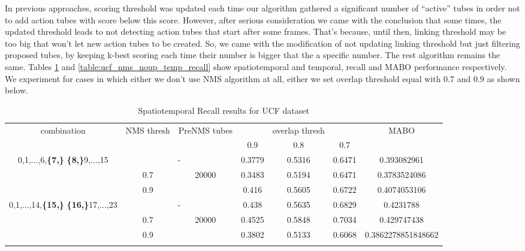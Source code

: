 In previous approaches, scoring threshold was updated each time our algorithm gathered a significant number of ``active'' tubes in order not
to add action tubes with score below this score. However, after serious consideration we came with the conclusion that some times, the updated
threshold leads to not detecting action tubes that start after some frames. That's because, until then, linking threshold may be too big that
won't let new action tubes to be created. So, we came with the modification of not updating linking threshold but just filtering proposed
tubes, by keeping k-best scoring each time their number is bigger that the a specific number. The rest algorithm remains the same. Tables
\ref{table:ucf_nms_noup_recall} and \ref{table:ucf_nms_noup_temp_recall} show spatiotemporal and temporal, recall and MABO performance respectively.
We experiment for cases in which either we don't use NMS algorithm at all, either we set overlap threshold equal with 0.7 and 0.9 as shown
below.

\begin{center}
  \setlength{\tabcolsep}{2pt}
\begin{longtable}{||c | c | c | c c c| c|}

  \hline
  \multirow{2}{*}{combination} & \multirow{2}{2.5em}{NMS thresh} & \multirow{2}{3.5em}{PreNMS tubes} &  {} &overlap thresh & {} & \multirow{2}{*}{MABO} \\
  {} & {} & {} &  0.9 &  0.8 & 0.7 & {}\\         
  \hline
  \multirow{3}{7em}{0,1,...,6,\textbf{\{7,\}}
  \textbf{\{8,\}}9,...,15 }   &   \multicolumn{2}{|c|}{-}     &  0.3779 & 0.5316 & 0.6471 & 0.393082961 \\
  \cline{2-7}
  {} & 0.7 &\multirow{2}{*}{20000}  & 0.3483  & 0.5194 & 0.6471 & 0.3783524086 \\
  \cline{2-2} \cline{4-7} 
  {} &  0.9   & {}   & 0.416 & 0.5605 & 0.6722 & 0.4074053106 \\
  \hline                                    
  \multirow{3}{7em}{0,1,...,14,\textbf{\{15,\}}
  \textbf{\{16,\}}17,...,23 }  &   \multicolumn{2}{|c|}{-} & 0.438 & 0.5635 & 0.6829 & 0.4231788 \\
  \cline{2-7}
  {} & 0.7 & \multirow{2}{*}{20000}   & 0.4525 & 0.5848 & 0.7034 & 0.429747438 \\
  \cline{2-2} \cline{4-7} 
  {} &  0.9   & {}   & 0.3802 & 0.5133 & 0.6068 & 0.3862278851848662 \\

  \hline                                    

  \caption{Spatiotemporal Recall results for UCF dataset}
  \label{table:ucf_nms_noup_recall}
\end{longtable} 
\end{center}

